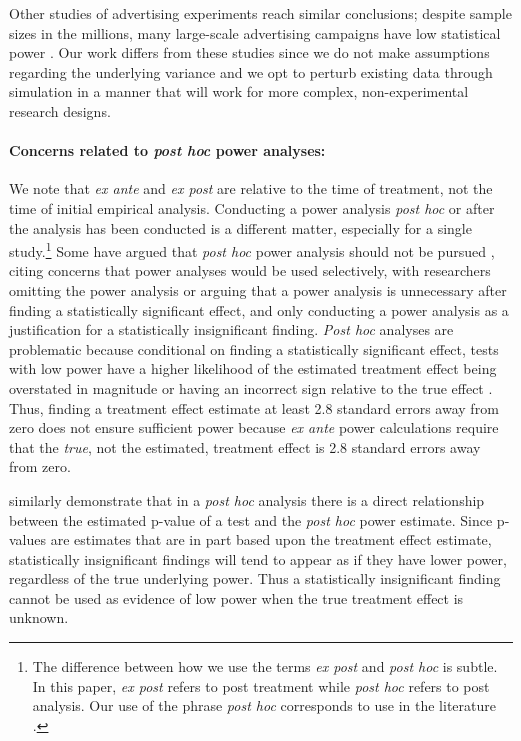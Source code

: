 \documentclass[12pt]{article}%
\begin{document}
Other studies of advertising experiments reach similar conclusions; despite sample sizes in the millions, many large-scale advertising campaigns have low statistical power \citep{lewisOnlineAdsOffline2014,johnsonWhenLessMore2017a}. 
Our work differs from these studies since we do not make assumptions regarding the underlying variance and we opt to perturb existing data through simulation in a manner that will work for more complex, non-experimental research designs.


\paragraph{Concerns related to \emph{post hoc} power analyses:}
We note that \emph{ex ante} and \emph{ex post} are relative to the time of treatment, not the time of initial empirical analysis. 
Conducting a power analysis \emph{post hoc} or after the analysis has been conducted is a different matter, especially for a single study.\footnote{The difference between how we use the terms \emph{ex post} and \emph{post hoc} is subtle. In this paper, \emph{ex post} refers to post treatment while \emph{post hoc} refers to post analysis. Our use of the phrase \emph{post hoc} corresponds to use in the literature \citep{gilbertMakingSenseMethods2016}.}
Some have argued that \emph{post hoc} power analysis should not be pursued \citep{Hoenig2001,gouveiaTimeSeriesAnalysis2000,Senn2002}, citing concerns that power analyses would be used selectively, with researchers omitting the power analysis or arguing that a power analysis is unnecessary after finding a statistically significant effect, and only conducting a power analysis as a justification for a statistically insignificant finding. 
\emph{Post hoc} analyses are problematic because conditional on finding a statistically significant effect, tests with low power have a higher likelihood of the estimated treatment effect being overstated in magnitude or having an incorrect sign relative to the true effect \citep{Gelman2014,Button2013}.
Thus, finding a treatment effect estimate at least 2.8 standard errors away from zero does not ensure sufficient power because \emph{ex ante} power calculations require that the \emph{true}, not the estimated, treatment effect is 2.8 standard errors away from zero. 

\citet{Hoenig2001} similarly demonstrate that in a \emph{post hoc} analysis there is a direct relationship between the estimated p-value of a test and the \emph{post hoc} power estimate.  
Since p-values are estimates that are in part based upon the treatment effect estimate, statistically insignificant findings will tend to appear as if they have lower power, regardless of the true underlying power. 
Thus a statistically insignificant finding cannot be used as evidence of low power when the true treatment effect is unknown. 
\end{document}
